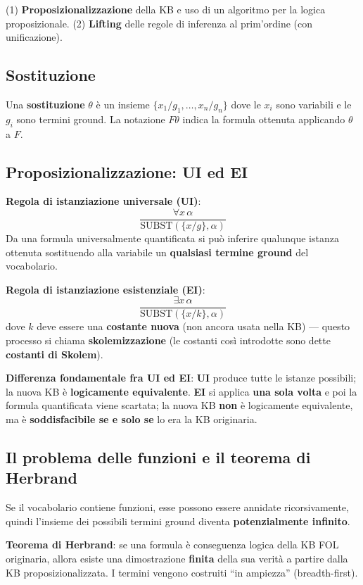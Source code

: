 \documentclass[11pt,a4paper]{report}
\begin{document}
(1) \textbf{Proposizionalizzazione} della KB e uso di un algoritmo per la logica proposizionale. (2) \textbf{Lifting} delle regole di inferenza al prim'ordine (con unificazione).

\subsection*{Sostituzione}

Una \textbf{sostituzione} $\theta$ è un insieme $\{x_1/g_1,\dots,x_n/g_n\}$ dove le $x_i$ sono variabili e le $g_i$ sono termini ground. La notazione $F\theta$ indica la formula ottenuta applicando $\theta$ a $F$.

\subsection*{Proposizionalizzazione: UI ed EI}

\textbf{Regola di istanziazione universale (UI)}:
\[
\frac{\forall x\,\alpha}{\text{SUBST}(\{x/g\},\alpha)}
\]
Da una formula universalmente quantificata si può inferire qualunque istanza ottenuta sostituendo alla variabile un \textbf{qualsiasi termine ground} del vocabolario.

\textbf{Regola di istanziazione esistenziale (EI)}:
\[
\frac{\exists x\,\alpha}{\text{SUBST}(\{x/k\},\alpha)}
\]
dove $k$ deve essere una \textbf{costante nuova} (non ancora usata nella KB) --- questo processo si chiama \textbf{skolemizzazione} (le costanti così introdotte sono dette \textbf{costanti di Skolem}).

\textbf{Differenza fondamentale fra UI ed EI}: \textbf{UI} produce tutte le istanze possibili; la nuova KB è \textbf{logicamente equivalente}. \textbf{EI} si applica \textbf{una sola volta} e poi la formula quantificata viene scartata; la nuova KB \textbf{non} è logicamente equivalente, ma è \textbf{soddisfacibile se e solo se} lo era la KB originaria.

\subsection*{Il problema delle funzioni e il teorema di Herbrand}

Se il vocabolario contiene funzioni, esse possono essere annidate ricorsivamente, quindi l'insieme dei possibili termini ground diventa \textbf{potenzialmente infinito}.

\textbf{Teorema di Herbrand}: se una formula è conseguenza logica della KB FOL originaria, allora esiste una dimostrazione \textbf{finita} della sua verità a partire dalla KB proposizionalizzata. I termini vengono costruiti ``in ampiezza'' (breadth-first).
\end{document}
